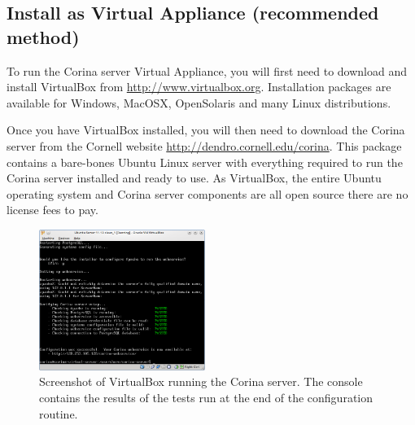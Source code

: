 \subsection[Install as Virtual Appliance]{Install as Virtual Appliance (recommended method)}
\label{txt:virtualAppliance}
To run the Corina server Virtual Appliance, you will first need to download and install VirtualBox from \url{http://www.virtualbox.org}.  Installation packages are available for Windows, MacOSX, OpenSolaris and many Linux distributions.

Once you have VirtualBox installed, you will then need to download the Corina server from the Cornell website \url{http://dendro.cornell.edu/corina}.  This package contains a bare-bones Ubuntu Linux server with everything required to run the Corina server installed and ready to use.  As VirtualBox, the entire Ubuntu operating system and Corina server components are all open source there are no license fees to pay.

\begin{figure}
  \begin{center}
    \includegraphics[width=0.48\textwidth]{Images/serverconfig.png}
  \end{center}
  \caption{Screenshot of VirtualBox running the Corina server.  The console contains the results of the tests run at the end of the configuration routine.}
  \label{fig:serverconfig}
\end{figure}

